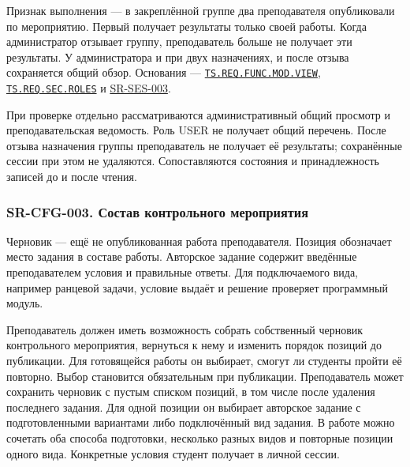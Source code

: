 \documentclass[12pt,a4paper]{article}
\begin{document}
Признак выполнения --- в закреплённой группе два преподавателя опубликовали по мероприятию. Первый получает результаты только своей работы. Когда администратор отзывает группу, преподаватель больше не получает эти результаты. У администратора и при двух назначениях, и после отзыва сохраняется общий обзор. Основания --- {\href{../02\_Техническое\_задание/Техническое\_задание.pdf\#ts-req-func-mod-view}{\texttt{TS.\allowbreak{}REQ.\allowbreak{}FUNC.\allowbreak{}MOD.\allowbreak{}VIEW}}}, {\href{../02\_Техническое\_задание/Техническое\_задание.pdf\#ts-req-sec-roles}{\texttt{TS.\allowbreak{}REQ.\allowbreak{}SEC.\allowbreak{}ROLES}}} и {\hyperlink{sr-ses-003}{SR-SES-003}}.

При проверке отдельно рассматриваются административный общий просмотр и преподавательская ведомость. Роль USER не получает общий перечень. После отзыва назначения группы преподаватель не получает её результаты; сохранённые сессии при этом не удаляются. Сопоставляются состояния и принадлежность записей до и после чтения.

\subsubsection{SR-CFG-003. Состав контрольного мероприятия}\label{sr-cfg-003-ux441ux43eux441ux442ux430ux432-ux43aux43eux43dux442ux440ux43eux43bux44cux43dux43eux433ux43e-ux43cux435ux440ux43eux43fux440ux438ux44fux442ux438ux44f}

\hypertarget{sr-cfg-003-состав-контрольного-мероприятия}{}

\hypertarget{sr-cfg-003}{}

Черновик --- ещё не опубликованная работа преподавателя. Позиция обозначает место задания в составе работы. Авторское задание содержит введённые преподавателем условия и правильные ответы. Для подключаемого вида, например ранцевой задачи, условие выдаёт и решение проверяет программный модуль.

Преподаватель должен иметь возможность собрать собственный черновик контрольного мероприятия, вернуться к нему и изменить порядок позиций до публикации. Для готовящейся работы он выбирает, смогут ли студенты пройти её повторно. Выбор становится обязательным при публикации. Преподаватель может сохранить черновик с пустым списком позиций, в том числе после удаления последнего задания. Для одной позиции он выбирает авторское задание с подготовленными вариантами либо подключённый вид задания. В работе можно сочетать оба способа подготовки, несколько разных видов и повторные позиции одного вида. Конкретные условия студент получает в личной сессии.
\end{document}

